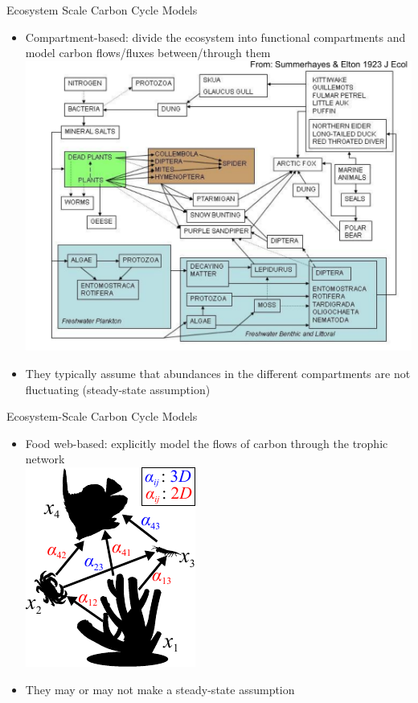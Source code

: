 \documentclass[xcolor={usenames,x11names},compress]{beamer}
\renewcommand{\(}{\begin{columns}}
\renewcommand{\)}{\end{columns}}
\newcommand{\<}[1]{\begin{column}{#1}}
\renewcommand{\>}{\end{column}}
\begin{document}
\begin{frame}{Ecosystem Scale Carbon Cycle Models}

  \begin{itemize}[<+->]\itemsep0pt
    \item Compartment-based: divide the ecosystem into functional compartments and model carbon flows/fluxes between/through them\\[10pt]
    \centering
    \includegraphics[width=.5\textwidth]{EltonFW.pdf}
    \item They typically assume that abundances in the different compartments are not fluctuating (steady-state assumption)  

  \end{itemize}
  
\end{frame}

\begin{frame}{Ecosystem-Scale Carbon Cycle Models}

  \begin{itemize}[<+->]\itemsep10pt
    \item Food web-based: explicitly model the flows of carbon through the trophic network\\[10pt]
    \centering
    \includegraphics[width=.35\textwidth]{FoodWeb.pdf}
  \item They may or may not make a steady-state assumption

  \end{itemize}
  
\end{frame}
\end{document}
